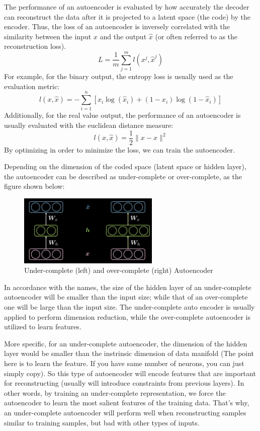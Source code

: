 The performance of an autoencoder is evaluated by how accurately the decoder can reconstruct the data after it is projected to a latent space (the code) by the encoder. Thus, the loss of an autoencoder is inversely correlated with the similarity between the input $x$ and the output $\hat{x}$ (or often referred to as the reconstruction loss). 
$$ L=\frac{1}{m}\sum_{j=1}^m l(x^j,\hat{x}^j) $$
For example, for the binary output, the entropy loss is usually used as the evaluation metric:
$$ l(x,\hat{x}) = -\sum_{i=1}^n[x_i\log(\hat{x}_i) + (1-x_i)\log(1-\hat{x}_i) ]$$
Additionally, for the real value output, the performance of an autoencoder is usually evaluated with the euclidean distance measure:
$$ l(x,\hat{x}) = \frac{1}{2} \| x-\hat{x} \|^2 $$
By optimizing in order to minimize the loss, we can train the autoencoder.

Depending on the dimension of the coded space (latent space or hidden layer), the autoencoder can be described as under-complete or over-complete, as the figure shown below:

\begin{figure}[htb]
    \centering
    \includegraphics[width=0.6\textwidth]{figs/Under_(over)_complete_Autoencoder.png}
    \caption{Under-complete (left) and over-complete (right) Autoencoder}
    \label{fig:Under_(over)_complete_Autoencoder}
\end{figure}

In accordance with the names, the size of the hidden layer of an under-complete autoencoder will be smaller than the input size; while that of an over-complete one will be large than the input size. The under-complete auto encoder is usually applied to perform dimension reduction, while the over-complete autoencoder is utilized to learn features.

More specific, for an under-complete autoencoder, the dimension of the hidden layer would be smaller than the instrinsic dimension of data manifold (The point here is to learn the feature. If you have same number of neurons, you can just simply copy). So this type of autoencoder will encode features that are important for reconstructing (usually will introduce constraints from previous layers). In other words, by training an under-complete representation, we force the autoencoder to learn the most salient features of the training data. That's why, an under-complete autoencoder will perform well when reconstructing samples similar to training samples, but bad with other types of inputs.  

